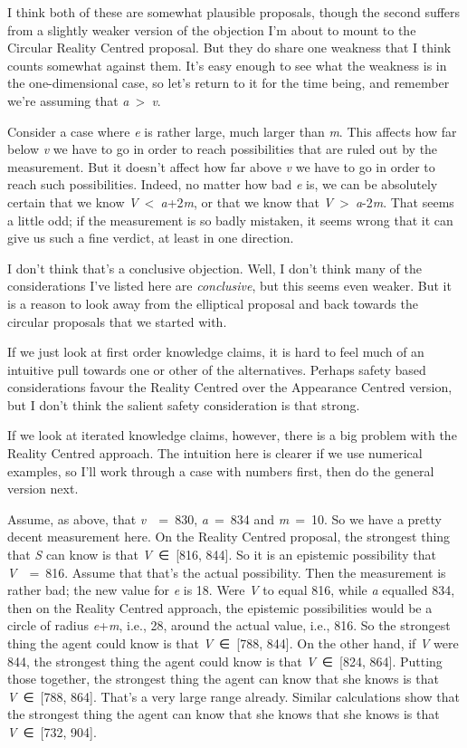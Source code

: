 \documentclass[
  11pt,
  letterpaper,
  DIV=11,
  numbers=noendperiod,
  twoside]{scrartcl}
\begin{document}
I think both of these are somewhat plausible proposals, though the
second suffers from a slightly weaker version of the objection I'm about
to mount to the Circular Reality Centred proposal. But they do share one
weakness that I think counts somewhat against them. It's easy enough to
see what the weakness is in the one-dimensional case, so let's return to
it for the time being, and remember we're assuming that
\emph{a}~\textgreater~\emph{v}.

Consider a case where \emph{e} is rather large, much larger than
\emph{m}. This affects how far below \emph{v} we have to go in order to
reach possibilities that are ruled out by the measurement. But it
doesn't affect how far above \emph{v} we have to go in order to reach
such possibilities. Indeed, no matter how bad \emph{e} is, we can be
absolutely certain that we know \emph{V}~\textless~\emph{a}+2\emph{m},
or that we know that \emph{V}~\textgreater~\emph{a}-2\emph{m}. That
seems a little odd; if the measurement is so badly mistaken, it seems
wrong that it can give us such a fine verdict, at least in one
direction.

I don't think that's a conclusive objection. Well, I don't think many of
the considerations I've listed here are \emph{conclusive}, but this
seems even weaker. But it is a reason to look away from the elliptical
proposal and back towards the circular proposals that we started with.

If we just look at first order knowledge claims, it is hard to feel much
of an intuitive pull towards one or other of the alternatives. Perhaps
safety based considerations favour the Reality Centred over the
Appearance Centred version, but I don't think the salient safety
consideration is that strong.

If we look at iterated knowledge claims, however, there is a big problem
with the Reality Centred approach. The intuition here is clearer if we
use numerical examples, so I'll work through a case with numbers first,
then do the general version next.

Assume, as above, that \emph{v}~~=~830, \emph{a}~=~834 and
\emph{m}~=~10. So we have a pretty decent measurement here. On the
Reality Centred proposal, the strongest thing that \emph{S} can know is
that \emph{V}~∈~{[}816, 844{]}. So it is an epistemic possibility that
\emph{V}~~=~816. Assume that that's the actual possibility. Then the
measurement is rather bad; the new value for \emph{e} is 18. Were
\emph{V} to equal 816, while \emph{a} equalled 834, then on the Reality
Centred approach, the epistemic possibilities would be a circle of
radius \emph{e}+\emph{m}, i.e., 28, around the actual value, i.e., 816.
So the strongest thing the agent could know is that \emph{V}~∈~{[}788,
844{]}. On the other hand, if \emph{V} were 844, the strongest thing the
agent could know is that \emph{V}~∈~{[}824, 864{]}. Putting those
together, the strongest thing the agent can know that she knows is that
\emph{V}~∈~{[}788, 864{]}. That's a very large range already. Similar
calculations show that the strongest thing the agent can know that she
knows that she knows is that \emph{V}~∈~{[}732, 904{]}.
\end{document}
